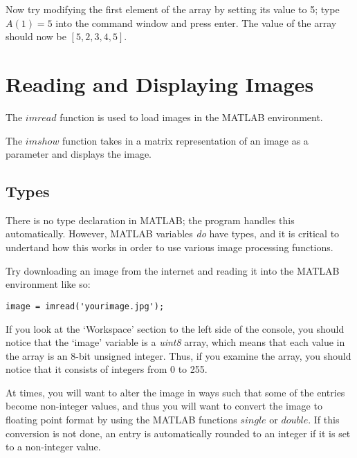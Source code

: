 \documentclass{article}
\begin{document}
Now try modifying the first element of the array by setting its value to 5; type $A(1)=5$ into the command window and press enter. The value of the array should now be $[5,2,3,4,5]$.


\section{Reading and Displaying Images}

The \href{https://www.mathworks.com/help/matlab/ref/imread.html}{$imread$} function is used to load images in the MATLAB environment.

The \href{https://www.mathworks.com/help/matlab/ref/imshow.html}{$imshow$} function takes in a matrix representation of an image as a parameter and displays the image.

\subsection{Types}
There is no type declaration in MATLAB; the program handles this automatically. However, MATLAB variables \textit{do} have types, and it is critical to undertand how this works in order to use various image processing functions.

Try downloading an image from the internet and reading it into the MATLAB environment like so:
\begin{lstlisting}[style=Matlab-editor]
image = imread('yourimage.jpg');
\end{lstlisting}

If you look at the `Workspace' section to the left side of the console, you should notice that the `image' variable is a \emph{uint8} array, which means that each value in the array is an 8-bit unsigned integer. Thus, if you examine the array, you should notice that it consists of integers from 0 to 255.

At times, you will want to alter the image in ways such that some of the entries become non-integer values, and thus you will want to convert the image to floating point format by using the MATLAB functions \href{https://www.mathworks.com/help/matlab/ref/single}{$single$} or \href{https://www.mathworks.com/help/matlab/ref/double}{$double$}. If this conversion is not done, an entry is automatically rounded to an integer if it is set to a non-integer value.
\end{document}
